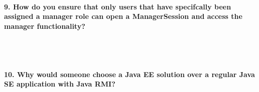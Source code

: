 \documentclass{ds-report}
\begin{document}
	\paragraph{9. How do you ensure that only users that have specifcally been assigned a manager role can open a ManagerSession and access the manager functionality?} \mbox{}\\\\








	\paragraph{10.  Why would someone choose a Java EE solution over a regular Java SE application with Java RMI?} \mbox{}\\\\



	
	\clearpage

	
\end{document}
